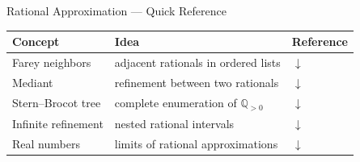 \begin{toolkitbox}{Rational Approximation --- Quick Reference}
\small
\begin{tabular}{l l l}
\toprule
\textbf{Concept} & \textbf{Idea} & \textbf{Reference} \\
\midrule
Farey neighbors & adjacent rationals in ordered lists & \hyperref[thm:farey-neighbors]{$\downarrow$} \\
Mediant & refinement between two rationals & \hyperref[def:mediant]{$\downarrow$} \\
Stern--Brocot tree & complete enumeration of $\mathbb{Q}_{>0}$ & \hyperref[thm:stern-brocot]{$\downarrow$} \\
Infinite refinement & nested rational intervals & \hyperref[thm:stern-brocot-limit]{$\downarrow$} \\
Real numbers & limits of rational approximations & \hyperref[def:real-limit-approx]{$\downarrow$} \\
\bottomrule
\end{tabular}
\end{toolkitbox}







